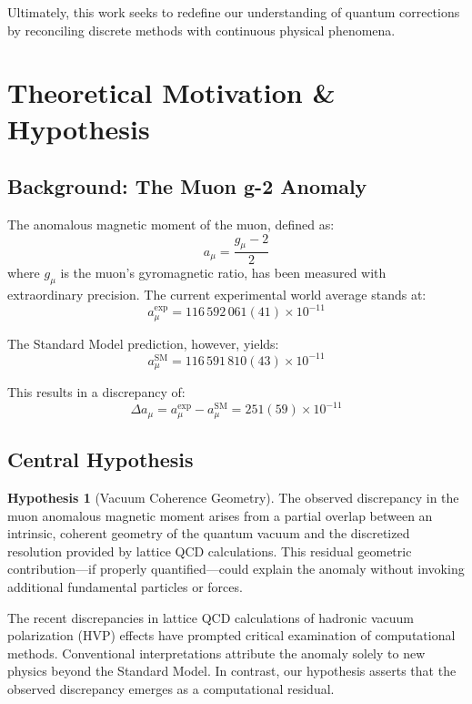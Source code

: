 ﻿\documentclass[12pt]{article}
\theoremstyle{definition}
\newtheorem{hypothesis}{Hypothesis}
\theoremstyle{plain}
\begin{document}
Ultimately, this work seeks to redefine our understanding of quantum corrections by reconciling discrete methods with continuous physical phenomena.


\section{Theoretical Motivation \& Hypothesis}


\subsection{Background: The Muon g-2 Anomaly}


The anomalous magnetic moment of the muon, defined as:
\begin{equation}
a_\mu = \frac{g_\mu - 2}{2}
\end{equation}
where $g_\mu$ is the muon's gyromagnetic ratio, has been measured with extraordinary precision. The current experimental world average stands at:
\begin{equation}
a_\mu^{\text{exp}} = 116\,592\,061(41) \times 10^{-11}
\end{equation}


The Standard Model prediction, however, yields:
\begin{equation}
a_\mu^{\text{SM}} = 116\,591\,810(43) \times 10^{-11}
\end{equation}


This results in a discrepancy of:
\begin{equation}
\Delta a_\mu = a_\mu^{\text{exp}} - a_\mu^{\text{SM}} = 251(59) \times 10^{-11}
\end{equation}


\subsection{Central Hypothesis}


\begin{hypothesis}[Vacuum Coherence Geometry]
The observed discrepancy in the muon anomalous magnetic moment arises from a partial overlap between an intrinsic, coherent geometry of the quantum vacuum and the discretized resolution provided by lattice QCD calculations. This residual geometric contribution---if properly quantified---could explain the anomaly without invoking additional fundamental particles or forces.
\end{hypothesis}


The recent discrepancies in lattice QCD calculations of hadronic vacuum polarization (HVP) effects have prompted critical examination of computational methods. Conventional interpretations attribute the anomaly solely to new physics beyond the Standard Model. In contrast, our hypothesis asserts that the observed discrepancy emerges as a computational residual.
\end{document}
